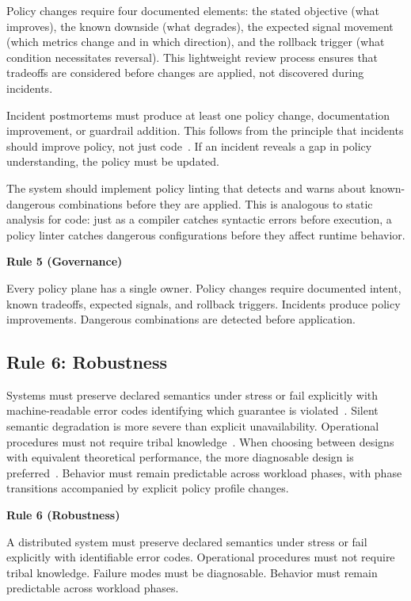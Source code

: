 \documentclass[conference]{IEEEtran}
\newenvironment{majorrule}[1]{%
    \vspace{0.5em}\noindent
    \colorbox{rulecolor!10!white}{%
        \parbox{\dimexpr\linewidth-2\fboxsep}{%
            \vspace{0.3em}\small\textbf{\textcolor{rulecolor}{Rule #1}}\vspace{0.2em}%
        }%
    }%
}{\vspace{0.5em}}
\begin{document}
Policy changes require four documented elements: the stated objective (what improves), the known downside (what degrades), the expected signal movement (which metrics change and in which direction), and the rollback trigger (what condition necessitates reversal). This lightweight review process ensures that tradeoffs are considered before changes are applied, not discovered during incidents.

Incident postmortems must produce at least one policy change, documentation improvement, or guardrail addition. This follows from the principle that incidents should improve policy, not just code~\cite{sre}. If an incident reveals a gap in policy understanding, the policy must be updated.

The system should implement policy linting that detects and warns about known-dangerous combinations before they are applied. This is analogous to static analysis for code: just as a compiler catches syntactic errors before execution, a policy linter catches dangerous configurations before they affect runtime behavior.

\begin{majorrule}{5 (Governance)}
Every policy plane has a single owner. Policy changes require documented intent, known tradeoffs, expected signals, and rollback triggers. Incidents produce policy improvements. Dangerous combinations are detected before application.
\end{majorrule}

\subsection{Rule 6: Robustness}

Systems must preserve declared semantics under stress or fail explicitly with machine-readable error codes identifying which guarantee is violated~\cite{leveson}. Silent semantic degradation is more severe than explicit unavailability. Operational procedures must not require tribal knowledge~\cite{dijkstra1972humble}. When choosing between designs with equivalent theoretical performance, the more diagnosable design is preferred~\cite{simon}. Behavior must remain predictable across workload phases, with phase transitions accompanied by explicit policy profile changes.

\begin{majorrule}{6 (Robustness)}
A distributed system must preserve declared semantics under stress or fail explicitly with identifiable error codes. Operational procedures must not require tribal knowledge. Failure modes must be diagnosable. Behavior must remain predictable across workload phases.
\end{majorrule}
\end{document}
